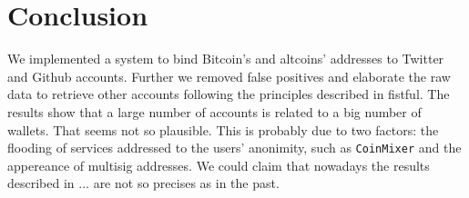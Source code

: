 \section{Conclusion} \label{conclusion}
We implemented a system to bind Bitcoin's and altcoins' addresses to Twitter
and Github accounts. Further we removed false positives and elaborate the raw
data to retrieve other accounts following the principles described in fistful.
The results show that a large number of accounts is related to a big number of
wallets. That seems not so plausible. This is probably due to two factors: the
flooding of services addressed to the users' anonimity, such as
\texttt{CoinMixer} and the appereance of multisig addresses. We could claim
that nowadays the results described in ... are not so precises as in the past.